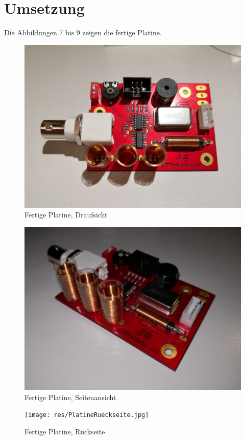 \section{Umsetzung}
Die Abbildungen 7 bis 9 zeigen die fertige Platine. 
\begin{figure}[H]\centering
	\includegraphics[width=16cm]{res/PlatineDraufsicht.jpg}
	\caption{Fertige Platine, Draufsicht}
\end{figure}
\begin{figure}[H]\centering
	\includegraphics[width=16cm]{res/PlatineSeite.jpg}
	\caption{Fertige Platine, Seitenansicht}
\end{figure}
\begin{figure}[H]\centering
	\texttt{[image: res/PlatineRueckseite.jpg]}
	\caption{Fertige Platine, Rückseite}
\end{figure}